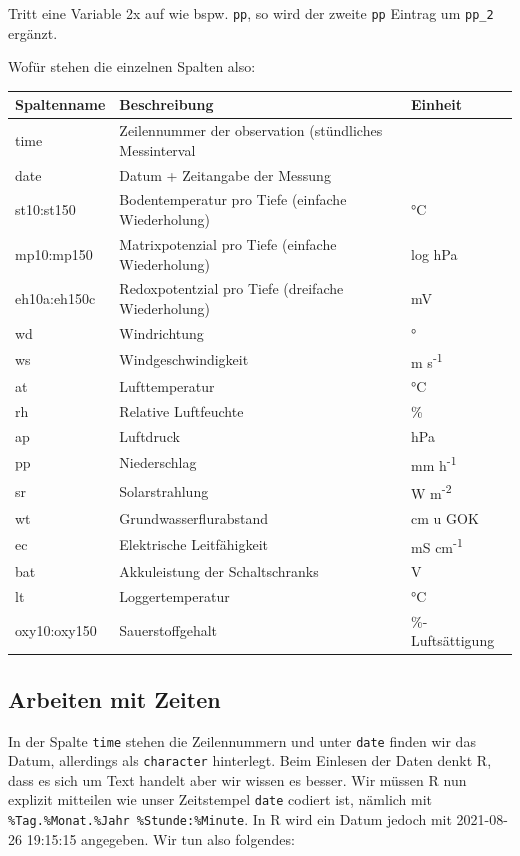\documentclass[
]{article}
\begin{document}
Tritt eine Variable 2x auf wie bspw. \texttt{pp}, so wird der zweite \texttt{pp} Eintrag um \texttt{pp\_2} ergänzt.

Wofür stehen die einzelnen Spalten also:

\begin{longtable}[]{@{}lll@{}}
\toprule
Spaltenname & Beschreibung & Einheit \\
\midrule
\endhead
time & Zeilennummer der observation (stündliches Messinterval & \\
date & Datum + Zeitangabe der Messung & \\
st10:st150 & Bodentemperatur pro Tiefe (einfache Wiederholung) & °C \\
mp10:mp150 & Matrixpotenzial pro Tiefe (einfache Wiederholung) & log hPa \\
eh10a:eh150c & Redoxpotentzial pro Tiefe (dreifache Wiederholung) & mV \\
wd & Windrichtung & ° \\
ws & Windgeschwindigkeit & m s\textsuperscript{-1} \\
at & Lufttemperatur & °C \\
rh & Relative Luftfeuchte & \% \\
ap & Luftdruck & hPa \\
pp & Niederschlag & mm h\textsuperscript{-1} \\
sr & Solarstrahlung & W m\textsuperscript{-2} \\
wt & Grundwasserflurabstand & cm u GOK \\
ec & Elektrische Leitfähigkeit & mS cm\textsuperscript{-1} \\
bat & Akkuleistung der Schaltschranks & V \\
lt & Loggertemperatur & °C \\
oxy10:oxy150 & Sauerstoffgehalt & \%-Luftsättigung \\
\bottomrule
\end{longtable}

\hypertarget{arbeiten-mit-zeiten}{%
\subsection{Arbeiten mit Zeiten}\label{arbeiten-mit-zeiten}}

In der Spalte \texttt{time} stehen die Zeilennummern und unter \texttt{date} finden wir das Datum, allerdings als \texttt{character} hinterlegt. Beim Einlesen der Daten denkt R, dass es sich um Text handelt aber wir wissen es besser. Wir müssen R nun explizit mitteilen wie unser Zeitstempel \texttt{date} codiert ist, nämlich mit \texttt{\%Tag.\%Monat.\%Jahr\ \%Stunde:\%Minute}. In R wird ein Datum jedoch mit 2021-08-26 19:15:15 angegeben. Wir tun also folgendes:
\end{document}
